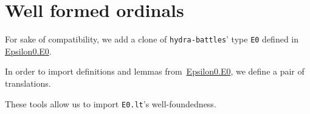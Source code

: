 








  
  
    
    

  
  


 



\section{Well formed ordinals}
For sake of compatibility, we add a clone of \texttt{hydra-battles}' type \texttt{E0} defined in \href{../theories/html/hydras.Epsilon0.E0.html}{Epsilon0.E0}.


In order to import definitions and lemmas
from~\href{../theories/html/hydras.Epsilon0.E0.html}{Epsilon0.E0}, we define a pair of translations.


These tools allow us to import \texttt{E0.lt}'s  well-foundedness.

